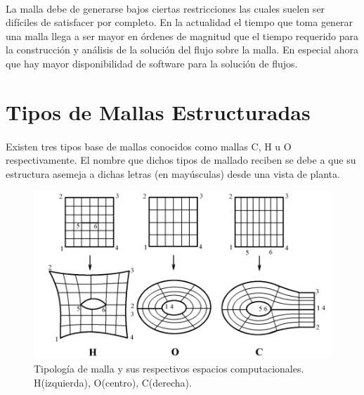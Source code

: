 \documentclass[letterpaper, openright, 12pt]{book}
\begin{document}
    \paragraph*{}
        La malla debe de generarse bajos ciertas restricciones las cuales suelen
        ser difíciles de satisfacer por completo. En la actualidad el tiempo que
        toma generar una malla llega a ser mayor en órdenes de magnitud que el
        tiempo requerido para la construcción y análisis de la solución del
        flujo sobre la malla. En especial ahora que hay mayor disponibilidad de
        software para la solución de flujos.\cite{thompsonhandbook}

\section{Tipos de Mallas Estructuradas}
    \paragraph*{}
        Existen tres tipos base de mallas conocidos como mallas C, H u O
        respectivamente. El nombre que dichos tipos de mallado reciben se debe
        a que su estructura asemeja a dichas letras (en mayúsculas) desde una
        vista de planta.

        \begin{figure}[htbp!]
            \centering
            \includegraphics[width=170mm]{./Imagenes/tipos-de-malla}
            \captionsetup{justification=centering, margin=2cm}
            \caption[Tipología de mallas]{Tipología de malla y sus respectivos espacios computacionales. H(izquierda), O(centro), C(derecha).\cite{vladimir-grid}}
            \label{fig:tipos-de-malla}
        \end{figure}
\end{document}
